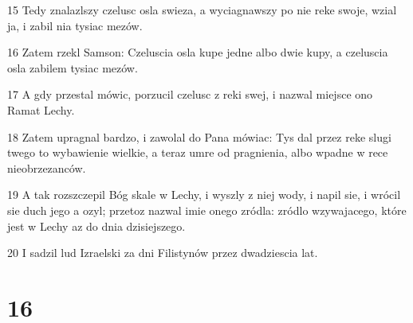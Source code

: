 \par 15 Tedy znalazlszy czelusc osla swieza, a wyciagnawszy po nie reke swoje, wzial ja, i zabil nia tysiac mezów.
\par 16 Zatem rzekl Samson: Czeluscia osla kupe jedne albo dwie kupy, a czeluscia osla zabilem tysiac mezów.
\par 17 A gdy przestal mówic, porzucil czelusc z reki swej, i nazwal miejsce ono Ramat Lechy.
\par 18 Zatem upragnal bardzo, i zawolal do Pana mówiac: Tys dal przez reke slugi twego to wybawienie wielkie, a teraz umre od pragnienia, albo wpadne w rece nieobrzezanców.
\par 19 A tak rozszczepil Bóg skale w Lechy, i wyszly z niej wody, i napil sie, i wrócil sie duch jego a ozyl; przetoz nazwal imie onego zródla: zródlo wzywajacego, które jest w Lechy az do dnia dzisiejszego.
\par 20 I sadzil lud Izraelski za dni Filistynów przez dwadziescia lat.

\chapter{16}

